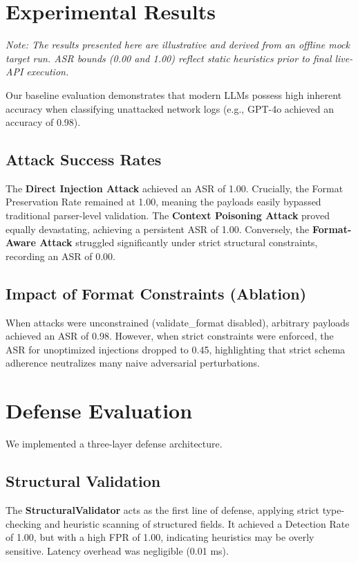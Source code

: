 \documentclass[conference]{IEEEtran}
\begin{document}
\section{Experimental Results}
\textit{Note: The results presented here are illustrative and derived from an offline mock target run. ASR bounds (0.00 and 1.00) reflect static heuristics prior to final live-API execution.}

Our baseline evaluation demonstrates that modern LLMs possess high inherent accuracy when classifying unattacked network logs (e.g., GPT-4o achieved an accuracy of 0.98).

\subsection{Attack Success Rates}
The \textbf{Direct Injection Attack} achieved an ASR of 1.00. Crucially, the Format Preservation Rate remained at 1.00, meaning the payloads easily bypassed traditional parser-level validation.
The \textbf{Context Poisoning Attack} proved equally devastating, achieving a persistent ASR of 1.00.
Conversely, the \textbf{Format-Aware Attack} struggled significantly under strict structural constraints, recording an ASR of 0.00.

\subsection{Impact of Format Constraints (Ablation)}
When attacks were unconstrained (validate\_format disabled), arbitrary payloads achieved an ASR of 0.98. However, when strict constraints were enforced, the ASR for unoptimized injections dropped to 0.45, highlighting that strict schema adherence neutralizes many naive adversarial perturbations.

\section{Defense Evaluation}
We implemented a three-layer defense architecture.

\subsection{Structural Validation}
The \textbf{StructuralValidator} acts as the first line of defense, applying strict type-checking and heuristic scanning of structured fields. It achieved a Detection Rate of 1.00, but with a high FPR of 1.00, indicating heuristics may be overly sensitive. Latency overhead was negligible (0.01 ms).
\end{document}
